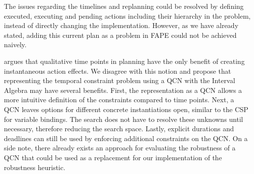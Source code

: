 The issues regarding the timelines and replanning could be resolved by defining executed, executing and pending actions including their hierarchy in the problem, instead of directly changing the implementation.
However, as we have already stated, adding this current plan as a problem in \ac{FAPE} could not be achieved naively.

\cite{bit-monnotTemporalHierarchicalModels2016a} argues that qualitative time points in planning have the only benefit of creating instantaneous action effects.
We disagree with this notion and propose that representing the temporal constraint problem using a \ac{QCN} \citep{ligozatQualitativeSpatialTemporal2013} with the Interval Algebra \citep{allenMaintainingKnowledgeTemporal1983a} may have several benefits.
First, the representation as a \ac{QCN} allows a more intuitive definition of the constraints compared to time points.
Next, a \ac{QCN} leaves options for different concrete instantiations open, similar to the \ac{CSP} for variable bindings.
The search does not have to resolve these unknowns until necessary, therefore reducing the search space.
Lastly, explicit durations and deadlines can still be used by enforcing additional constraints on the \ac{QCN}.
On a side note, there already exists an approach for evaluating the robustness of a \ac{QCN} \citep{wehnerRobustVsFast2023} that could be used as a replacement for our implementation of the robustness heuristic.





